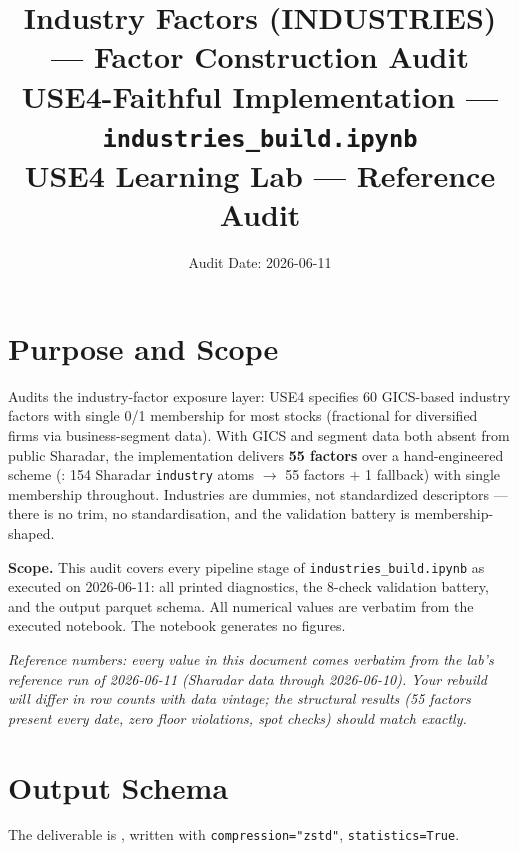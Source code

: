 \documentclass[11pt,a4paper]{article}
\title{\textbf{Industry Factors (INDUSTRIES) --- Factor Construction Audit}\\[2pt]
\large USE4-Faithful Implementation --- \texttt{industries\_build.ipynb}\\[4pt]
\normalsize USE4 Learning Lab --- Reference Audit}
\author{Audit Date: 2026-06-11}
\date{}
\newcommand{\NOTE}[1]{\textcolor{note}{\textit{#1}}}
\begin{document}
\maketitle
\tableofcontents
\newpage

\section{Purpose and Scope}

Audits the industry-factor exposure layer: USE4 specifies 60 GICS-based industry
factors with single 0/1 membership for most stocks (fractional for diversified
firms via business-segment data). With GICS and segment data both absent from
public Sharadar, the implementation delivers \textbf{55 factors} over a
hand-engineered scheme (: 154 Sharadar
\texttt{industry} atoms $\to$ 55 factors $+$ 1 fallback) with single membership
throughout. Industries are dummies, not standardized descriptors --- there is no
trim, no standardisation, and the validation battery is membership-shaped.

\smallskip
\textbf{Scope.} This audit covers every pipeline stage of
\texttt{industries\_build.ipynb} as executed on 2026-06-11: all printed
diagnostics, the 8-check validation battery, and the output parquet schema.
All numerical values are verbatim from the executed notebook. The notebook
generates no figures.

\NOTE{Reference numbers: every value in this document comes verbatim from the lab's reference run of 2026-06-11 (Sharadar data through 2026-06-10). Your rebuild will differ in row counts with data vintage; the structural results (55 factors present every date, zero floor violations, spot checks) should match exactly.}


\section{Output Schema}

The deliverable is ,
written with \texttt{compression="zstd"}, \newline\texttt{statistics=True}.
\end{document}
